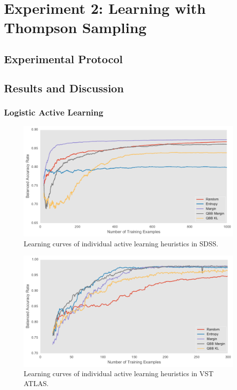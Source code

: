 

\chapter{Experiment 2: Learning with Thompson Sampling}
\label{cha:expt2}

\section{Experimental Protocol}
\label{sec:protocol2}



\section{Results and Discussion}
\label{sec:results2}

\subsection{Logistic Active Learning}

\begin{figure}[tbp]
	\centering
	\includegraphics[width=\textwidth]{figures/lc_active_logistic_balanced}
	\caption{Learning curves of individual active learning heuristics in SDSS.}
	\label{fig:lc_active_logistic_balanced} 
\end{figure}

\begin{figure}[tbp]
	\centering
	\includegraphics[width=\textwidth]{figures/active_heuristics_lc_vst}
	\caption{Learning curves of individual active learning heuristics in VST ATLAS.}
	\label{fig:active_heuristics_lc_vst} 
\end{figure}

